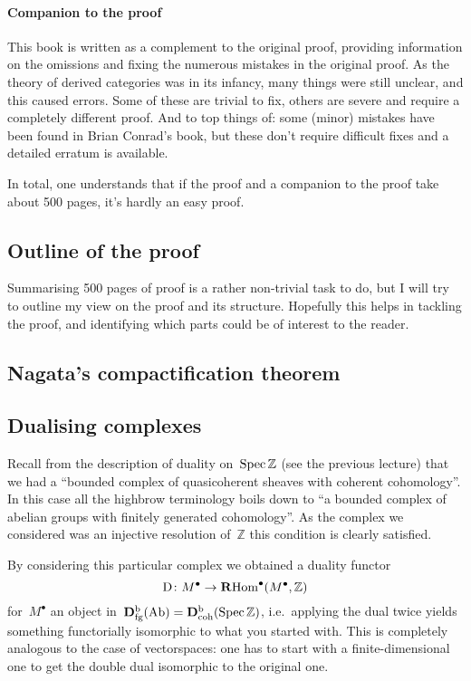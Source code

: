 \documentclass[10pt,a4paper]{article}
\begin{document}
\paragraph{Companion to the proof}
This book is written as a complement to the original proof, providing information on the omissions and fixing the numerous mistakes in the original proof. As the theory of derived categories was in its infancy, many things were still unclear, and this caused errors. Some of these are trivial to fix, others are severe and require a completely different proof. And to top things of: some (minor) mistakes have been found in Brian Conrad's book, but these don't require difficult fixes and a detailed erratum is available.

In total, one understands that if the proof and a companion to the proof take about 500 pages, it's hardly an easy proof.

\subsection{Outline of the proof}
Summarising 500 pages of proof is a rather non-trivial task to do, but I will try to outline my view on the proof and its structure. Hopefully this helps in tackling the proof, and identifying which parts could be of interest to the reader.

\subsection{Nagata's compactification theorem}

\subsection{Dualising complexes}
Recall from the description of duality on~$\operatorname{Spec}\mathbb{Z}$ (see the previous lecture) that we had a ``bounded complex of quasicoherent sheaves with coherent cohomology''. In this case all the highbrow terminology boils down to ``a bounded complex of abelian groups with finitely generated cohomology''. As the complex we considered was an injective resolution of~$\mathbb{Z}$ this condition is clearly satisfied.

By considering this particular complex we obtained a duality functor
\begin{equation}
  \operatorname{D}\colon M^\bullet\to\operatorname{\mathbf{R}Hom}^\bullet(M^\bullet,\mathbb{Z})
\end{equation}
for~$M^\bullet$ an object in~$\mathbf{D}_{\mathrm{fg}}^{\mathrm{b}}(\mathrm{Ab})=\mathbf{D}_{\mathrm{coh}}^{\mathrm{b}}(\operatorname{Spec}\mathbb{Z})$, i.e.\ applying the dual twice yields something functorially isomorphic to what you started with. This is completely analogous to the case of vectorspaces: one has to start with a finite-dimensional one to get the double dual isomorphic to the original one.
\end{document}
